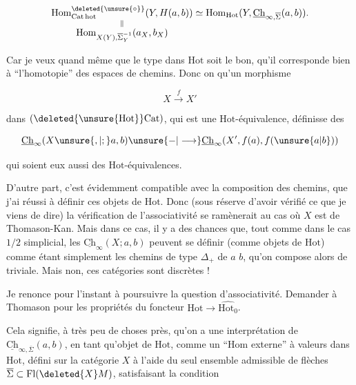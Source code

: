 \[
\underset{\substack{\Vert\\ \displaystyle\mathrm{Hom}_{X(Y),\overline\Sigma_Y^{-1}}(a_X,b_X)}}{\mathrm{Hom}^{\deleted{\unsure{\circ}}}_{\mathrm{Cat\,hot}}(Y,H(a,b))}
\simeq\mathrm{Hom}_{\mathrm{Hot}}(Y,\underline{\mathrm{Ch}}_{\infty,\overline\Sigma}(a,b)).
\]



Car je veux quand même que le type dans $\mathrm{Hot}$ soit le bon, qu'il corresponde bien à ``l'homotopie'' des espaces de chemins. Donc  on  qu'un morphisme

\[
X\xrightarrow{f}X'
\]

dans $(\deleted{\unsure{\mathrm{Hot}}}\mathrm{Cat})$, qui est une $\mathrm{Hot}$-équivalence, définisse des

\[
\underline{\mathrm{Ch}}_\infty(X\unsure{,|;}a,b)\unsure{-|\longrightarrow}\underline{\mathrm{Ch}}_\infty(X',f(a),f(\unsure{a|b}))
\]

qui soient eux aussi des $\mathrm{Hot}$-équivalences.

D'autre part, c'est évidemment compatible avec la  composition des chemins, que j'ai réussi à définir  ces objets de $\mathrm{Hot}$. Donc  (sous réserve d'avoir vérifié ce que je viens de dire) la vérification de l'associativité se ramènerait au cas où $X$ est de Thomason-Kan. Mais dans ce cas, il y a des chances que, tout comme dans le cas $1/2$ simplicial, les $\underline{\mathrm{Ch}}_\infty(X;a,b)$ peuvent se définir  (comme objets de $\mathrm{Hot}$) comme étant simplement les chemins de type $\Delta_+$ de $a$  $b$, qu'on compose alors de  triviale. Mais non, ces catégories sont discrètes !

Je renonce pour l'instant à poursuivre  la question d'associativité. Demander à Thomason pour les propriétés du foncteur $\mathrm{Hot}\longrightarrow\widehat{\mathrm{Hot}_0}$.


Cela signifie, à très peu de choses près, qu'on a une interprétation de $\underline{\mathrm{Ch}}_{\infty,\overline\Sigma}(a,b)$, en tant qu'objet de $\mathrm{Hot}$, comme un ``$\mathrm{Hom}$ externe''  à valeurs dans $\mathrm{Hot}$, défini sur la catégorie  $X$ à l'aide du seul ensemble admissible \deleted{\unsure{\Sigma}} de flèches $\overline\Sigma\subset\mathrm{Fl}(\deleted{X}M)$,  satisfaisant la condition

